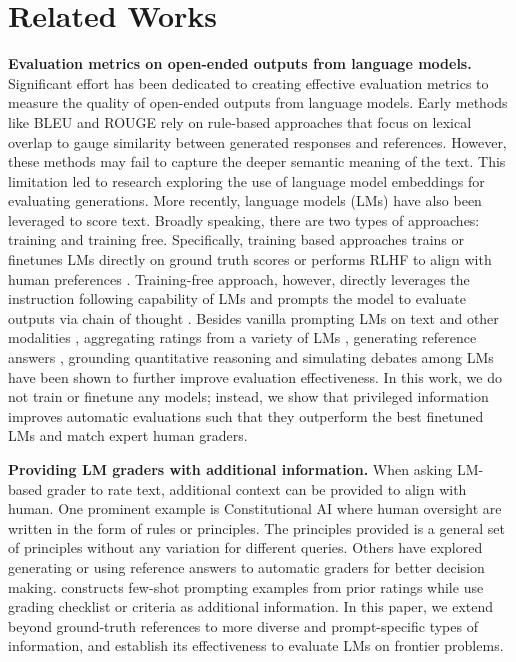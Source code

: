 \section{Related Works}\label{sec:related_works}

\textbf{Evaluation metrics on open-ended outputs from language models.}
Significant effort has been dedicated to creating effective evaluation metrics to measure the quality of open-ended outputs from language models. Early methods like BLEU \citep{Papineni2001-xx} and ROUGE \citep{lin2004rouge} rely on rule-based approaches that focus on lexical overlap to gauge similarity between generated responses and references. However, these methods may fail to capture the deeper semantic meaning of the text. This limitation led to research exploring the use of language model embeddings \citep{Zhang2019-qr,sellam2020bleurt,yuan2021bartscore} for evaluating generations. More recently, language models (LMs) have also been leveraged to score text. Broadly speaking, there are two types of approaches: training and training free. Specifically, training based approaches trains or finetunes LMs directly on ground truth scores \citep{Juraska2023-tk,wang2024interpretable,Kim2024-tn,Vu2024-nh} or performs RLHF to align with human preferences \citep{Ouyang2022-ea,Sun2023-qz,Li2023-ka,Yuan2024-jj,Zhang2024-bn,Shankar2024-al}. Training-free approach, however, directly leverages the instruction following capability of LMs and prompts the model to evaluate outputs via chain of thought \citep{Wei2022-kp}. Besides vanilla prompting LMs on text and other modalities \citep{Zheng2023-mh,Yu2023-tz}, aggregating ratings from a variety of LMs \citep{Verga2024-ct,Ning2024-ca}, generating reference answers \citep{Zeng2023-zt}, grounding quantitative reasoning \citep{Zhou2024-ql} and simulating debates among LMs \citep{Khan2024-jf} have been shown to further improve evaluation effectiveness. In this work, we do not train or finetune any models; instead, we show that privileged information improves automatic evaluations such that they outperform the best finetuned LMs and match expert human graders.

\textbf{Providing LM graders with additional information.} When asking LM-based grader to rate text, additional context can be provided to align with human. One prominent example is Constitutional AI \citep{Bai2022-uh} where human oversight are written in the form of rules or principles. The principles provided is a general set of principles without any variation for different queries. Others \citep{vu2023freshllms,Zeng2023-zt,Yu2023-tz,Bai2023-tp,Padlewski2024-ag} have explored generating or using reference answers to automatic graders for better decision making. \citet{finkelstein2024jack} constructs few-shot prompting examples from prior ratings while \citet{cook2024ticking,zhang2024reviseval} use grading checklist or criteria as additional information.
In this paper, we extend \PI beyond ground-truth references to more diverse and prompt-specific types of information, and establish its effectiveness to evaluate LMs on frontier problems.
